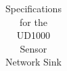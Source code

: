 \begin{table}[H]
\begin{tabularx}{\linewidth}{| l | l | X |}
	\end{tabularx}
	\caption{Specifications for the UD1000 Sensor Network Sink \cite{UD1000}}
	\label{tab:UD1000-spec}
\end{table}
